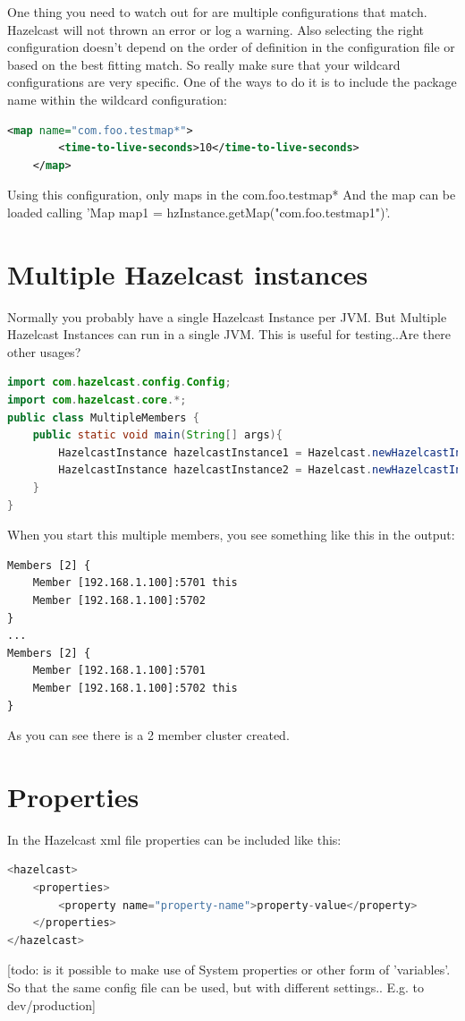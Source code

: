 One thing you need to watch out for are multiple configurations that match. Hazelcast will not thrown an error or log a warning. Also selecting the right configuration doesn't depend on the order of definition in the configuration file or based on the best fitting match. So really make sure that your wildcard configurations are very specific. One of the ways to do it is to include the package name within the wildcard configuration:
\begin{lstlisting}[language=xml]
    <map name="com.foo.testmap*">
        <time-to-live-seconds>10</time-to-live-seconds>
    </map>
\end{lstlisting}
Using this configuration, only maps in the com.foo.testmap* 
And the map can be loaded calling 'Map map1 = hzInstance.getMap("com.foo.testmap1")'. 

\section{Multiple Hazelcast instances}
Normally you probably have a single Hazelcast Instance per JVM. But 
Multiple Hazelcast Instances can run in a single JVM. This is useful for testing..Are there other usages?

\begin{lstlisting}[language=java]
import com.hazelcast.config.Config;
import com.hazelcast.core.*;
public class MultipleMembers {
    public static void main(String[] args){
        HazelcastInstance hazelcastInstance1 = Hazelcast.newHazelcastInstance(null);
        HazelcastInstance hazelcastInstance2 = Hazelcast.newHazelcastInstance(null);
    }
}
\end{lstlisting}
When you start this multiple members, you see something like this in the output:
\begin{verbatim}
Members [2] {
    Member [192.168.1.100]:5701 this
    Member [192.168.1.100]:5702
}
...
Members [2] {
    Member [192.168.1.100]:5701
    Member [192.168.1.100]:5702 this
}
\end{verbatim}
As you can see there is a 2 member cluster created.

\section{Properties}
In the Hazelcast xml file properties can be included like this:
\begin{lstlisting}[language=java]
<hazelcast>
    <properties>
        <property name="property-name">property-value</property>
    </properties>
</hazelcast>
\end{lstlisting}
[todo: is it possible to make use of System properties or other form of 'variables'. So that the same config file can be used, but with different settings.. E.g. to dev/production]

